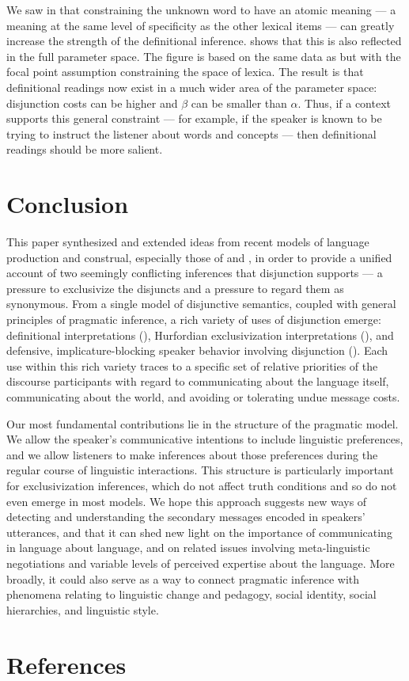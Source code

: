 \documentclass[12pt,twoside]{article}
\renewcommand{\_}{\textbf{\textunderscore\hspace{-4pt}\textunderscore\hspace{-3pt}\textunderscore\hspace{-4pt}\textunderscore}\hspace{0.5pt}}			%
\begin{document}
We saw in  that constraining the
unknown word to have an atomic meaning --- a meaning at the same level
of specificity as the other lexical items --- can greatly increase the
strength of the definitional inference.   shows
that this is also reflected in the full parameter space. The figure is
based on the same data as  but with the focal point
assumption constraining the space of lexica. The result is that
definitional readings now exist in a much wider area of the parameter
space: disjunction costs can be higher and $\beta$ can be smaller than
$\alpha$. Thus, if a context supports this general constraint --- for
example, if the speaker is known to be trying to instruct the listener
about words and concepts --- then definitional readings should be more
salient.



\section{Conclusion}\label{sec:conclusion}

This paper synthesized and extended ideas from recent models of
language production and construal, especially those of
\citet{Smith:Goodman:Frank:2013} and \citet{bergen-levy-goodman:2014},
in order to provide a unified account of two seemingly conflicting
inferences that disjunction supports --- a pressure to exclusivize the
disjuncts and a pressure to regard them as synonymous.  From a single
model of disjunctive semantics, coupled with general principles of
pragmatic inference, a rich variety of uses of disjunction emerge:
definitional interpretations (),
Hurfordian exclusivization interpretations
(), and defensive,
implicature-blocking speaker behavior involving disjunction 
().  Each use within this rich variety
traces to a specific set of relative priorities of the discourse
participants with regard to communicating about the language itself,
communicating about the world, and avoiding or tolerating undue
message costs.

Our most fundamental contributions lie in the structure of the
pragmatic model. We allow the speaker's communicative intentions to
include linguistic preferences, and we allow listeners to make
inferences about those preferences during the regular course of
linguistic interactions. This structure is particularly important for
exclusivization inferences, which do not affect truth conditions and
so do not even emerge in most models.  We hope this approach suggests
new ways of detecting and understanding the secondary messages encoded
in speakers' utterances, and that it can shed new light on the
importance of communicating in language about language, and on related
issues involving meta-linguistic negotiations and variable levels of
perceived expertise about the language. More broadly, it could also
serve as a way to connect pragmatic inference with phenomena relating
to linguistic change and pedagogy, social identity, social
hierarchies, and linguistic style.


\section{References}


\end{document}

